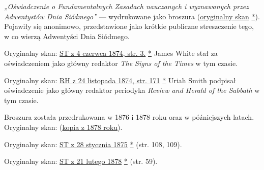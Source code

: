 

\textit{„Oświadczenie o Fundamentalnych Zasadach nauczanych i wyznawanych przez Adwentystów Dnia Siódmego”} — wydrukowane jako broszura (\href{https://adventistdigitallibrary.org/islandora/object/adl:366607?link_only=true}{oryginalny skan} \href{https://forgotten-pillar.s3.us-east-2.amazonaws.com/A+declaration+of+the+fundamental+principles+taught+and+practiced+by+the+Seventh-day+Adventists++.pdf}{*}). Pojawiły się anonimowo, przedstawione jako krótkie publiczne streszczenie tego, w co wierzą Adwentyści Dnia Siódmego.


Oryginalny skan: \href{https://adventistdigitallibrary.org/adl-364148/signs-times-june-4-1874}{ST z 4 czerwca 1874, str. 3.} \href{https://forgotten-pillar.s3.us-east-2.amazonaws.com/Signs+of+the+Times+_+June+4%2C+1874++.pdf}{*} James White stał za oświadczeniem jako główny redaktor \textit{The Signs of the Times} w tym czasie.


Oryginalny skan: \href{https://documents.adventistarchives.org/Periodicals/RH/RH18741124-V44-22.pdf}{RH z 24 listopada 1874, str. 171} \href{https://forgotten-pillar.s3.us-east-2.amazonaws.com/RH18741124-V44-22.pdf}{*} Uriah Smith podpisał oświadczenie jako główny redaktor periodyka \textit{Review and Herald of the Sabbath} w tym czasie.


Broszura została przedrukowana w 1876 i 1878 roku oraz w późniejszych latach. \\
Oryginalny skan: (\href{https://adventistdigitallibrary.org/islandora/object/adl%3A22250872?solr_nav%5Bid%5D=a09d3902c2540c98eb7f&solr_nav%5Bpage%5D=56&solr_nav%5Boffset%5D=3}{kopia z 1878 roku}).


Oryginalny skan: \href{https://documents.adventistarchives.org/Periodicals/ST/ST18750128-V01-14.pdf#search=ST18750128}{ST z 28 stycznia 1875} \href{https://forgotten-pillar.s3.us-east-2.amazonaws.com/ST18750128-V01-14.pdf}{*} (str. 108, 109).


Oryginalny skan: \href{https://documents.adventistarchives.org/Periodicals/ST/ST18780221-V04-08.pdf#search=%22As%20already%20stated%2C%20S%2E%20D%2E%20Adventists%22}{ST z 21 lutego 1878} \href{https://forgotten-pillar.s3.us-east-2.amazonaws.com/ST18780221-V04-08.pdf}{*} (str. 59).

